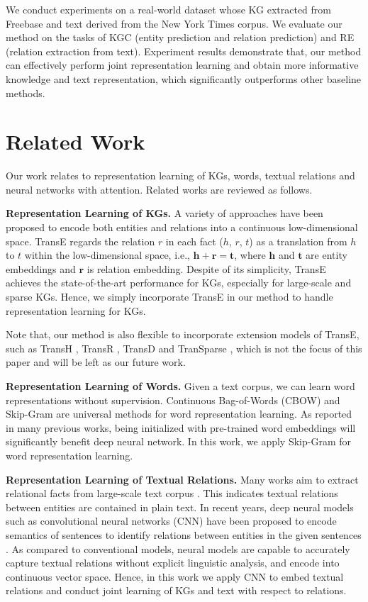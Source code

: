 \documentclass[11pt,a4paper]{article}
\begin{document}
We conduct experiments on a real-world dataset whose KG extracted from Freebase and text derived from the New York Times corpus. We evaluate our method on the tasks of KGC (entity prediction and relation prediction) and RE (relation extraction from text). Experiment results demonstrate that, our method can effectively perform joint representation learning and obtain more informative knowledge and text representation, which significantly outperforms other baseline methods.

\section{Related Work}
\label{sec:related}
Our work relates to representation learning of KGs, words, textual relations and neural networks with attention. Related works are reviewed as follows.

\textbf{Representation Learning of KGs.} A variety of approaches have been proposed to encode both entities and relations into a continuous low-dimensional space. TransE \cite{bordes2013translating} regards the relation $r$ in each fact ($h$, $r$, $t$) as a translation from $h$ to $t$ within the low-dimensional space, i.e., $\textbf{h} + \textbf{r} = \textbf{t}$, where $\textbf{h}$ and $\textbf{t}$ are entity embeddings and $\textbf{r}$ is relation embedding. Despite of its simplicity, TransE achieves the state-of-the-art performance for KGs, especially for large-scale and sparse KGs. Hence, we simply incorporate TransE in our method to handle representation learning for KGs.

Note that, our method is also flexible to incorporate extension models of TransE, such as TransH \cite{wang2014transh}, TransR \cite{lin2015learning}, TransD \cite{ji2015knowledge} and TranSparse \cite{ji2016knowledge}, which is not the focus of this paper and will be left as our future work.

\textbf{Representation Learning of Words.} Given a text corpus, we can learn word representations without supervision. Continuous Bag-of-Words (CBOW) \cite{mikolov2013efficient} and Skip-Gram \cite{mikolov2013linguistic} are universal methods for word representation learning. As reported in many previous works, being initialized with pre-trained word embeddings will significantly benefit deep neural network. In this work, we apply Skip-Gram for word representation learning.

\textbf{Representation Learning of Textual Relations.} Many works aim to extract relational facts from large-scale text corpus \cite{mintz2009distant,riedel2010modeling}. This indicates textual relations between entities are contained in plain text. In recent years, deep neural models such as convolutional neural networks (CNN) have been proposed to encode semantics of sentences to identify relations between entities in the given sentences \cite{zeng2014relation,dos2015classifying,zeng2015distant,lin2016neural}. As compared to conventional models, neural models are capable to accurately capture textual relations without explicit linguistic analysis, and encode into continuous vector space. Hence, in this work we apply CNN to embed textual relations and conduct joint learning of KGs and text with respect to relations.
\end{document}

